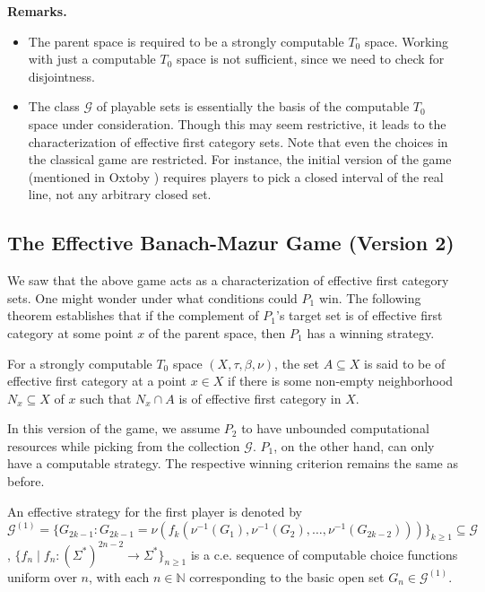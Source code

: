 \documentclass[a4paper,UKenglish,autoref,thm-restate,numberwithinsect]{lipics-v2021}
\begin{document}
\textbf{Remarks.} 
\begin{itemize}
	\item The parent space is required to be a strongly computable $T_0$ space. Working with just a computable $T_0$ space is not sufficient, since we need to check for disjointness. 
	\item The class $\mathcal{G}$ of playable sets is essentially the basis of the computable $T_0$ space under consideration. Though this may seem restrictive, it leads to the characterization of effective first category sets. Note that even the choices in the classical game are restricted. For instance, the initial version of the game (mentioned in	Oxtoby \cite{Oxtoby1980}) requires players to pick a closed interval of the real line, not any arbitrary closed set. 
\end{itemize}

\subsection{The Effective Banach-Mazur Game (Version 2)}
We saw that the above game acts as a characterization of effective first category sets. One might wonder under what conditions could $P_1$ win. The following theorem establishes that if the complement of $P_1$'s target set is of effective first category at some point $x$ of the parent space, then $P_1$ has a winning strategy. 

\begin{definition}
	For a strongly computable $T_0$ space $(X,\tau,\beta,\nu)$, the set $A\subseteq X$ is said to be of effective first category at a point $x\in X$ if there is some non-empty neighborhood $N_x\subseteq X$ of $x$ such that $N_x\cap A$ is of effective first category in $X$. 
\end{definition}

In this version of the game, we assume $P_2$ to have unbounded computational resources while picking from the collection $\mathcal{G}$. $P_1$, on the other hand, can only have a computable strategy. The respective winning criterion remains the same as before. 

\begin{definition}
	An effective strategy for the first player is denoted by $\mathcal{G}^{(1)} = \{G_{2k-1}:G_{2k-1} = \nu(f_k\left(\nu^{-1}(G_1),\nu^{-1}(G_2),\ldots,\nu^{-1}(G_{2k-2})\right))\}_{k\geq1}\subseteq\mathcal{G}$, $\{f_n\mid f_n:(\Sigma^*)^{2n-2}\to\Sigma^*\}_{n\geq1}$ is a c.e. sequence of computable choice functions uniform over $n$, with each $n\in\mathbb{N}$ corresponding to the basic open set $G_n\in\mathcal{G}^{(1)}$. 
\end{definition}
\end{document}
